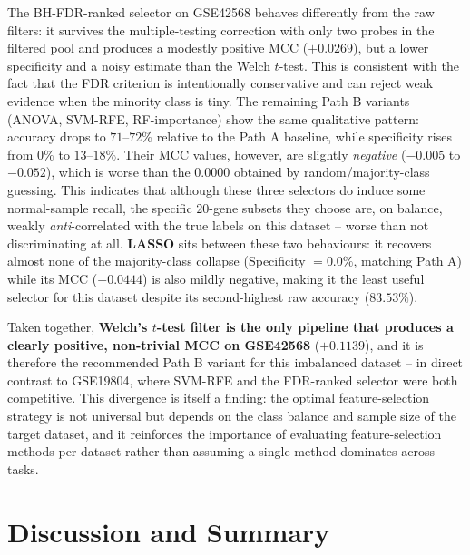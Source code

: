 The BH-FDR-ranked selector on GSE42568 behaves differently from the raw filters: it survives the multiple-testing correction with only two probes in the filtered pool and produces a modestly positive MCC ($+0.0269$), but a lower specificity and a noisy estimate than the Welch $t$-test. This is consistent with the fact that the FDR criterion is intentionally conservative and can reject weak evidence when the minority class is tiny. The remaining Path B variants (ANOVA, SVM-RFE, RF-importance) show the same qualitative pattern: accuracy drops to $71$--$72\%$ relative to the Path A baseline, while specificity rises from $0\%$ to $13$--$18\%$. Their MCC values, however, are slightly \emph{negative} ($-0.005$ to $-0.052$), which is worse than the $0.0000$ obtained by random/majority-class guessing. This indicates that although these three selectors do induce some normal-sample recall, the specific $20$-gene subsets they choose are, on balance, weakly \emph{anti}-correlated with the true labels on this dataset -- worse than not discriminating at all. \textbf{LASSO} sits between these two behaviours: it recovers almost none of the majority-class collapse (Specificity $=0.0\%$, matching Path A) while its MCC ($-0.0444$) is also mildly negative, making it the least useful selector for this dataset despite its second-highest raw accuracy ($83.53\%$).

Taken together, \textbf{Welch's $t$-test filter is the only pipeline that produces a clearly positive, non-trivial MCC on GSE42568} ($+0.1139$), and it is therefore the recommended Path B variant for this imbalanced dataset -- in direct contrast to GSE19804, where SVM-RFE and the FDR-ranked selector were both competitive. This divergence is itself a finding: the optimal feature-selection strategy is not universal but depends on the class balance and sample size of the target dataset, and it reinforces the importance of evaluating feature-selection methods per dataset rather than assuming a single method dominates across tasks.

\section{Discussion and Summary}

